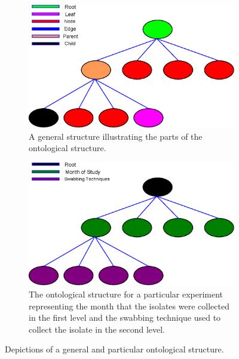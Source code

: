 \documentclass[12pt]{ucthesis}
\begin{document}
      \begin{figure}[t]
         \centering
         \begin{subfigure}[t]{0.45\textwidth}
            \centering
            \includegraphics[width=\textwidth]{graphics/IsolateTree.eps}
            \caption{A general structure illustrating the parts of the ontological
                     structure.}
            \label{fig:general_structure}
         \end{subfigure}
         \hfill
         \begin{subfigure}[t]{0.45\textwidth}
            \centering
            \includegraphics[width=\textwidth]{graphics/IsolateTree_CurrentStudy.eps}
            \caption{The ontological structure for a particular experiment
                     representing the month that the isolates were collected in
                     the first level and the swabbing technique used to collect the
                     isolate in the second level.}
            \label{fig:cluster_structure}
         \end{subfigure}
         \caption{Depictions of a general and particular ontological structure.}
         \label{fig:ontology_structure}
      \end{figure}
\end{document}
